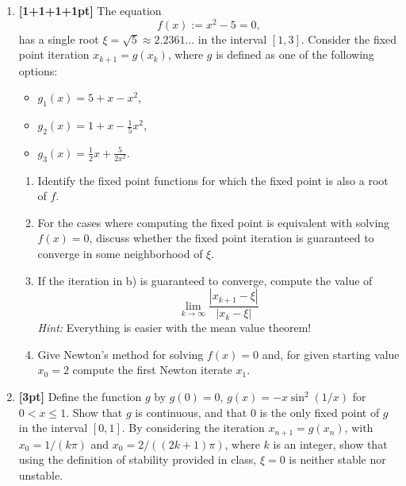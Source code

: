 \documentclass[11pt]{article}
\begin{document}
\begin{enumerate}


  \item {\bf [1+1+1+1pt]}
  The equation
  $$
  f(x):=x^2 - 5 = 0,
  $$ has a single root $\xi = \sqrt{5} \approx 2.2361 \hdots$ in the
  interval $[1,3]$.  Consider the fixed point iteration $x_{k+1} = g(x_k)$,
  where $g$ is defined as one of the following options:
  \begin{itemize}
  \item $g_1(x) = 5 + x - x^2$,
  \item $g_2(x) = 1+x - \frac{1}{5}x^2$,
  \item $g_3(x) = \frac{1}{2}x + \frac{5}{2x^2}$.
  \end{itemize}
  \begin{enumerate}
    \item Identify the fixed point functions for which the fixed point is also a root of
      $f$.
    \item For the cases where computing the fixed point is equivalent
      with solving $f(x)=0$, discuss whether the fixed point
      iteration is guaranteed to converge in some neighborhood of
      $\xi$.
    \item If the iteration in b) is guaranteed to converge,
      compute the value of
      $$
      \lim_{k\rightarrow\infty}\frac{|x_{k+1} - \xi|}{|x_{k} - \xi|}
      $$
      \emph{Hint:} Everything is easier with the mean value theorem!
    \item Give Newton's method for solving $f(x)=0$ and, for given
      starting value $x_0=2$ compute the first Newton iterate $x_1$.
  \end{enumerate}


\item {\bf [3pt]} 
Define the function $g$ by $g(0) = 0$, $g(x) = -x\sin^2(1/x)$ for $0 < x \leq 1$.  Show that $g$ is continuous, and that $0$ is the only fixed point of $g$ in the interval $[0,1]$.  By considering the iteration $x_{n+1} = g(x_n)$, with $x_0 = 1/(k\pi)$ and $x_0 = 2/((2k+1)\pi)$, where $k$ is an integer, show that using the definition of stability provided in class, $\xi=0 $ is neither stable nor unstable.


\end{enumerate}
\end{document}

